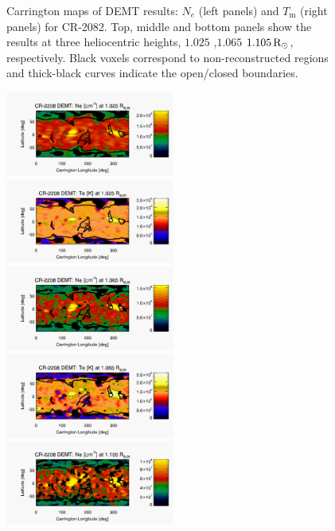 \documentclass[namedreferences]{solarphysics}
\newcommand{\mrsun}{{\rm R_\odot}}
\begin{document}
\begin{article}
\begin{figure}
\begin{center}
\caption{Carrington maps of DEMT results: $N_e$ (left panels) and $T_\textrm{m}$ (right panels) for CR-2082. Top, middle and bottom panels show the results at three heliocentric heights, $1.025$ ,$1.065$ $1.105\,\mrsun$, respectively. Black voxels correspond to non-reconstructed regions and thick-black curves indicate the open/closed boundaries.}
\label{carmaps_demt_2082}
\end{center}
\end{figure}

\begin{figure}%
\begin{center}
\includegraphics[width=0.495\textwidth]{figs/map_Ne_CR2208_DEMT-AIA_H1_L522_r3d_1025_Rsun.pdf}
\includegraphics[width=0.495\textwidth]{figs/map_Tm_CR2208_DEMT-AIA_H1_L522_r3d_1025_Rsun.pdf}
\includegraphics[width=0.495\textwidth]{figs/map_Ne_CR2208_DEMT-AIA_H1_L522_r3d_1065_Rsun.pdf}
\includegraphics[width=0.495\textwidth]{figs/map_Tm_CR2208_DEMT-AIA_H1_L522_r3d_1065_Rsun.pdf}
\includegraphics[width=0.495\textwidth]{figs/map_Ne_CR2208_DEMT-AIA_H1_L522_r3d_1105_Rsun.pdf}

\end{center}
\end{figure}
\end{article}
\end{document}
